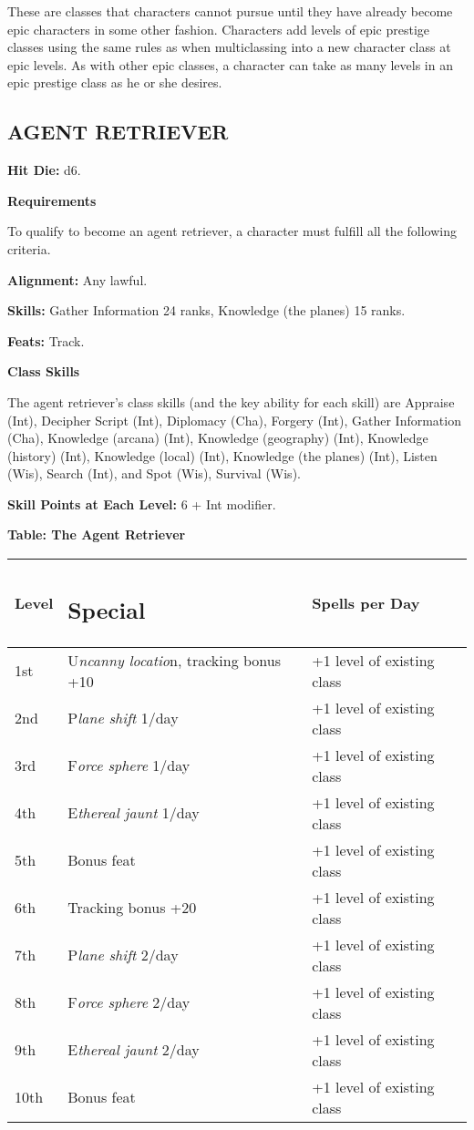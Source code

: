 \documentclass{article}
\begin{document}
These are classes that characters cannot pursue until they have already become 
epic characters in some other fashion. Characters add levels of epic prestige classes 
using the same rules as when multiclassing into a new character class at epic levels. 
As with other epic classes, a character can take as many levels in an epic prestige 
class as he or she desires. 

\vspace{12pt}
\subsection*{{\LARGE{}AGENT RETRIEVER }}

\textbf{Hit Die:} d6. 

\textbf{Requirements}

To qualify to become an agent retriever, a character must fulfill all the following 
criteria. 

\textbf{Alignment:} Any lawful. 

\textbf{Skills:} Gather Information 24 ranks, Knowledge (the planes) 15 ranks. 

\textbf{Feats:} Track. 

\textbf{Class Skills}

The agent retriever's class skills (and the key ability for each skill) are Appraise 
(Int), Decipher Script (Int), Diplomacy (Cha), Forgery (Int), Gather Information 
(Cha), Knowledge (arcana) (Int), Knowledge (geography) (Int), Knowledge (history) 
(Int), Knowledge (local) (Int), Knowledge (the planes) (Int), Listen (Wis), Search 
(Int), and Spot (Wis), Survival (Wis).

\textbf{Skill Points at Each Level:} 6 + Int modifier. 

\vspace{12pt}
\textbf{Table: The Agent Retriever }

\begin{tabular}{|>{\raggedright}p{27pt}|>{\raggedright}p{157pt}|>{\raggedright}p{105pt}|}
\hline
L\textbf{evel} & \subsection*{S\textbf{pecial}} & S\textbf{pells per Day }\tabularnewline
\hline
1st & U\textit{ncanny locatio}n, tracking bonus +10 & +1 level of existing class 
\tabularnewline
\hline
2nd & P\textit{lane shift }1/day  & +1 level of existing class \tabularnewline
\hline
3rd & F\textit{orce sphere }1/day  & +1 level of existing class \tabularnewline
\hline
4th & E\textit{thereal jaunt }1/day  & +1 level of existing class \tabularnewline
\hline
5th & Bonus feat & +1 level of existing class \tabularnewline
\hline
6th & Tracking bonus +20  & +1 level of existing class \tabularnewline
\hline
7th & P\textit{lane shift }2/day  & +1 level of existing class \tabularnewline
\hline
8th & F\textit{orce sphere }2/day  & +1 level of existing class \tabularnewline
\hline
9th & E\textit{thereal jaunt }2/day  & +1 level of existing class \tabularnewline
\hline
10th & Bonus feat & +1 level of existing class \tabularnewline
\hline
\end{tabular}
\end{document}
